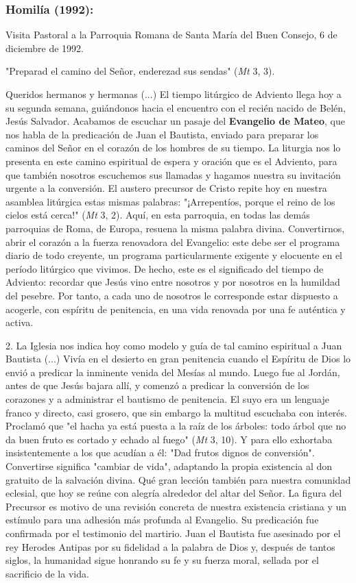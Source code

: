 \begin{body}
\subsubsection{Homilía (1992): }

Visita Pastoral a la Parroquia Romana de Santa María del Buen Consejo, 6 de diciembre de 1992.

\begin{body} 
"Preparad el camino del Señor, enderezad sus sendas" (\emph{Mt} 3, 3).

Queridos hermanos y hermanas (...) El tiempo litúrgico de Adviento llega hoy a su segunda semana, guiándonos hacia el encuentro con el recién nacido de Belén, Jesús Salvador. Acabamos de escuchar un pasaje del \textbf{Evangelio de Mateo}, que nos habla de la predicación de Juan el Bautista, enviado para preparar los caminos del Señor en el corazón de los hombres de su tiempo. La liturgia nos lo presenta en este camino espiritual de espera y oración que es el Adviento, para que también nosotros escuchemos sus llamadas y hagamos nuestra su invitación urgente a la conversión. El austero precursor de Cristo repite hoy en nuestra asamblea litúrgica estas mismas palabras: "¡Arrepentíos, porque el reino de los cielos está cerca!" (\emph{Mt} 3, 2). Aquí, en esta parroquia, en todas las demás parroquias de Roma, de Europa, resuena la misma palabra divina. Convertirnos, abrir el corazón a la fuerza renovadora del Evangelio: este debe ser el programa diario de todo creyente, un programa particularmente exigente y elocuente en el período litúrgico que vivimos. De hecho, este es el significado del tiempo de Adviento: recordar que Jesús vino entre nosotros y por nosotros en la humildad del pesebre. Por tanto, a cada uno de nosotros le corresponde estar dispuesto a acogerle, con espíritu de penitencia, en una vida renovada por una fe auténtica y activa.

2. La Iglesia nos indica hoy como modelo y guía de tal camino espiritual a Juan Bautista (...) Vivía en el desierto en gran penitencia cuando el Espíritu de Dios lo envió a predicar la inminente venida del Mesías al mundo. Luego fue al Jordán, antes de que Jesús bajara allí, y comenzó a predicar la conversión de los corazones y a administrar el bautismo de penitencia. El suyo era un lenguaje franco y directo, casi grosero, que sin embargo la multitud escuchaba con interés. Proclamó que "el hacha ya está puesta a la raíz de los árboles: todo árbol que no da buen fruto es cortado y echado al fuego" (\emph{Mt} 3, 10). Y para ello exhortaba insistentemente a los que acudían a él: "Dad frutos dignos de conversión". Convertirse significa "cambiar de vida", adaptando la propia existencia al don gratuito de la salvación divina. Qué gran lección también para nuestra comunidad eclesial, que hoy se reúne con alegría alrededor del altar del Señor. La figura del Precursor es motivo de una revisión concreta de nuestra existencia cristiana y un estímulo para una adhesión más profunda al Evangelio. Su predicación fue confirmada por el testimonio del martirio. Juan el Bautista fue asesinado por el rey Herodes Antipas por su fidelidad a la palabra de Dios y, después de tantos siglos, la humanidad sigue honrando su fe y su fuerza moral, sellada por el sacrificio de la vida.


\end{body}
\end{body}
